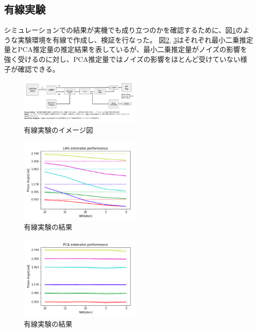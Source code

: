 \documentclass[a4j,10pt]{jsarticle}
\begin{document}
\subsection{有線実験}
シミュレーションでの結果が実機でも成り立つのかを確認するために、図\ref{experiment}のような実験環境を有線で作成し、検証を行なった。
図\ref{lms}, \ref{pca}はそれぞれ最小二乗推定量とPCA推定量の推定結果を表しているが、最小二乗推定量がノイズの影響を強く受けるのに対し、PCA推定量ではノイズの影響をほとんど受けていない様子が確認できる。

\begin{figure}[htbp]
    \begin{center}
        \includegraphics[width=6cm]{experiment.png}
        \caption{有線実験のイメージ図}
        \label{experiment}
    \end{center}
\end{figure}

\begin{figure}[htbp]
    \begin{center}
        \includegraphics[width=6cm]{lms_performance.png}
        \caption{有線実験の結果}
        \label{lms}
    \end{center}
\end{figure}

\begin{figure}[htbp]
    \begin{center}
        \includegraphics[width=6cm]{pca_performance.png}
        \caption{有線実験の結果}
        \label{pca}
    \end{center}
\end{figure}
\end{document}
